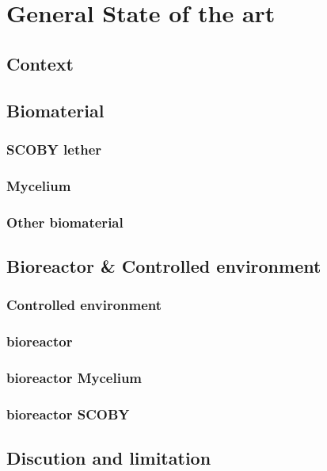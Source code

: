 \chapter{General State of the art}


\section{Context}


\section{Biomaterial}

\subsection{SCOBY lether}
\subsection{Mycelium}
\subsection{Other biomaterial}

\section{Bioreactor & Controlled environment }

\subsection{Controlled environment}
\subsection{bioreactor}
\subsection{bioreactor Mycelium}
\subsection{bioreactor SCOBY}


\section{Discution and limitation}